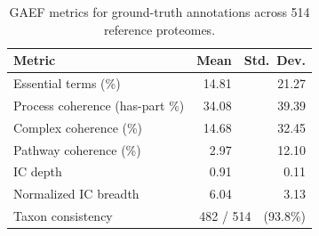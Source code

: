 \begin{table}[!h]
\centering
\caption{GAEF metrics for ground-truth annotations across 514 reference proteomes.}
\label{tab:supp-gaef-gt}
\small
\begin{tabular}{lrr}
\toprule
Metric & Mean & Std.\ Dev. \\
\midrule
Essential terms (\%) & 14.81 & 21.27 \\
Process coherence (has-part \%) & 34.08 & 39.39 \\
Complex coherence (\%) & 14.68 & 32.45 \\
Pathway coherence (\%) & 2.97 & 12.10 \\
IC depth & 0.91 & 0.11 \\
Normalized IC breadth & 6.04 & 3.13 \\
\midrule
Taxon consistency & \multicolumn{2}{r}{482 / 514\ \ (93.8\%)} \\
\bottomrule
\end{tabular}
\end{table}
